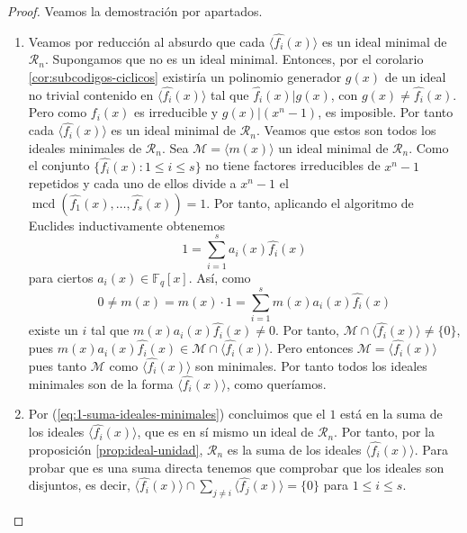 \begin{proof}
  Veamos la demostración por apartados.
  \begin{enumerate}
    \item Veamos por reducción al absurdo que cada \(\langle \widehat{f_i}(x)\rangle\) es un ideal minimal de \(\mathcal R_n\).
    Supongamos que no es un ideal minimal.
    Entonces, por el corolario \ref{cor:subcodigos-ciclicos} existiría un polinomio generador \(g(x)\) de un ideal no trivial contenido en \(\langle \widehat{f_i}(x)\rangle\) tal que \(\widehat{f_i}(x) | g(x)\), con \(g(x) \neq \widehat{f_i}(x)\).
    Pero como \(f_i(x)\) es irreducible y \(g(x) | (x^n - 1)\), es imposible.
    Por tanto cada \(\langle \widehat{f_i}(x)\rangle\) es un ideal minimal de \(\mathcal R_n\).
    Veamos que estos son todos los ideales minimales de \(\mathcal R_n\).
    Sea \(\mathcal M = \langle m(x) \rangle\) un ideal minimal de \(\mathcal R_n\).
    Como el conjunto \(\{\widehat{f_i}(x) : 1 \leq i \leq s\}\) no tiene factores irreducibles de \(x^n - 1\) repetidos y cada uno de ellos divide a \(x^n - 1\) el \(\operatorname{mcd}(\widehat{f_1}(x), \dots, \widehat{f_s}(x)) = 1\).
    Por tanto, aplicando el algoritmo de Euclides inductivamente obtenemos
    \begin{equation}
      1 = \sum_{i = 1}^s a_i(x)\widehat{f_i}(x)
      \label{eq:1-suma-ideales-minimales}
    \end{equation}
    para ciertos \(a_i(x) \in \mathbb F_q[x]\).
    Así, como 
    \[
      0 \neq m(x) = m(x) \cdot 1 = \sum_{i = 1}^s m(x)a_i(x)\widehat{f_i}(x)
    \]
    existe un \(i\) tal que \(m(x)a_i(x)\widehat{f_i}(x) \neq 0\).
    Por tanto, \(\mathcal M \cap \langle \widehat{f_i}(x) \rangle \neq \{0\}\), pues \(m(x)a_i(x)\widehat{f_i}(x) \in \mathcal M \cap \langle \widehat{f_i}(x) \rangle\).
    Pero entonces \(\mathcal M = \langle \widehat{f_i}(x) \rangle\) pues tanto \(\mathcal M\) como \(\langle \widehat{f_i}(x) \rangle\) son minimales.
    Por tanto todos los ideales minimales son de la forma \(\langle \widehat{f_i}(x) \rangle\), como queríamos.
    \item Por (\ref{eq:1-suma-ideales-minimales}) concluimos que el \(1\) está en la suma de los ideales \(\langle \widehat{f_i}(x) \rangle\), que es en sí mismo un ideal de \(\mathcal R_n\).
    Por tanto, por la proposición \ref{prop:ideal-unidad}, \(\mathcal R_n\) es la suma de los ideales \(\langle \widehat{f_i}(x) \rangle\).
    Para probar que es una suma directa tenemos que comprobar que los ideales son disjuntos, es decir, \(\langle \widehat{f_i}(x) \rangle \cap \sum_{j\neq i} \langle \widehat{f_j}(x) \rangle = \{0\}\) para \(1 \leq i \leq s\).

\end{enumerate}
\end{proof}
